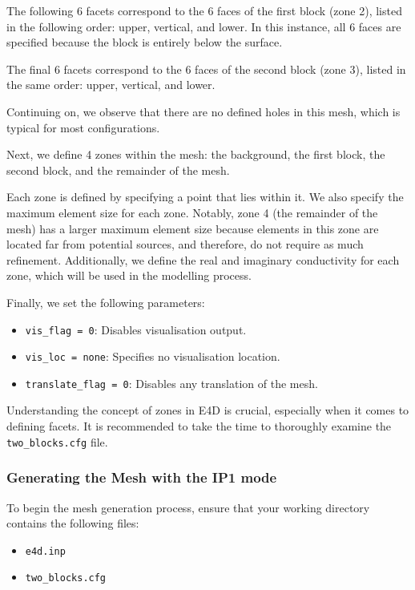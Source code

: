 \documentclass[a4paper,12pt]{article}
\begin{document}
The following 6 facets correspond to the 6 faces of the first block (zone 2), listed in the following order: upper, vertical, and lower. In this instance, all 6 faces are specified because the block is entirely below the surface.

The final 6 facets correspond to the 6 faces of the second block (zone 3), listed in the same order: upper, vertical, and lower.

Continuing on, we observe that there are no defined holes in this mesh, which is typical for most configurations.

Next, we define 4 zones within the mesh: the background, the first block, the second block, and the remainder of the mesh.

Each zone is defined by specifying a point that lies within it. We also specify the maximum element size for each zone. Notably, zone 4 (the remainder of the mesh) has a larger maximum element size because elements in this zone are located far from potential sources, and therefore, do not require as much refinement. Additionally, we define the real and imaginary conductivity for each zone, which will be used in the modelling process.

Finally, we set the following parameters:

\begin{itemize}
    \item \texttt{vis\_flag = 0}: Disables visualisation output.
    \item \texttt{vis\_loc = none}: Specifies no visualisation location.
    \item \texttt{translate\_flag = 0}: Disables any translation of the mesh.
\end{itemize}

Understanding the concept of zones in E4D is crucial, especially when it comes to defining facets. It is recommended to take the time to thoroughly examine the \texttt{two\_blocks.cfg} file.

\subsubsection{Generating the Mesh with the IP1 mode}

To begin the mesh generation process, ensure that your working directory contains the following files:

\begin{itemize}
    \item \texttt{e4d.inp}
    \item \texttt{two\_blocks.cfg}
\end{itemize}
\end{document}
